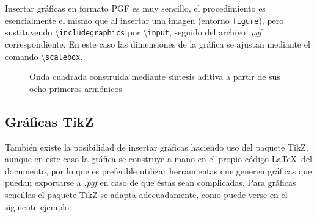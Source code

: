 \documentclass[a4paper, 11pt, spanish, twoside]{article}
\begin{document}
Insertar gráficas en formato PGF es muy sencillo, el procedimiento es esencialmente el mismo que al insertar una imagen (entorno \texttt{figure}), pero sustituyendo \textbackslash\texttt{includegraphics} por \textbackslash\texttt{input}, seguido del archivo \textit{.pgf} correspondiente. En este caso las dimensiones de la gráfica se ajustan mediante el comando \textbackslash\texttt{scalebox}. 

\begin{figure}[H]
    \centering
    \scalebox{1.1}{}
    \caption{Onda cuadrada construida mediante síntesis aditiva a partir de sus ocho primeros armónicos}
    \label{fig:ondacuadrada}
\end{figure}


\subsection{Gráficas TikZ} \label{sec:graficastikz}

También existe la posibilidad de insertar gráficas haciendo uso del paquete TikZ, aunque en este caso la gráfica se construye a mano en el propio código \LaTeX \ del documento, por lo que es preferible utilizar herramientas que generen gráficas que puedan exportarse a \textit{.pgf} en caso de que éstas sean complicadas. Para gráficas sencillas el paquete TikZ se adapta adecuadamente, como puede verse en el siguiente ejemplo:

\vspace{5pt}
\end{document}
